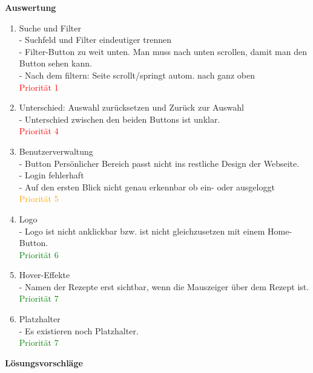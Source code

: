 \documentclass[parskip,10pt,abstracton]{scrartcl}
\begin{document}
\textbf{Auswertung}\\
\begin{enumerate}
\item Suche und Filter \\
- Suchfeld und Filter eindeutiger trennen\\
- Filter-Button zu weit unten. Man muss nach unten scrollen, damit man den Button sehen kann.\\
- Nach dem filtern: Seite scrollt/springt autom. nach ganz oben\\
\textcolor{red}{Priorität 1}

\item Unterschied: Auswahl zurücksetzen und Zurück zur Auswahl\\ 
- Unterschied zwischen den beiden Buttons ist unklar.\\
\textcolor{red}{Priorität 4}

\item Benutzerverwaltung \\
- Button Persönlicher Bereich passt nicht ins restliche Design der Webseite.\\
- Login fehlerhaft\\
- Auf den ersten Blick nicht genau erkennbar ob ein- oder ausgeloggt \\
\textcolor{orange}{Priorität 5}

\item Logo\\
- Logo ist nicht anklickbar bzw. ist nicht gleichzusetzen mit einem Home-Button. \\
\textcolor{green}{Priorität 6}

\item Hover-Effekte\\
- Namen der Rezepte erst sichtbar, wenn die Mauszeiger über dem Rezept ist. \\
\textcolor{green}{Priorität 7}

\item Platzhalter\\
- Es existieren noch Platzhalter.\\
\textcolor{green}{Priorität 7}
\end{enumerate}
\textbf{Lösungsvorschläge}\\
\end{document}

